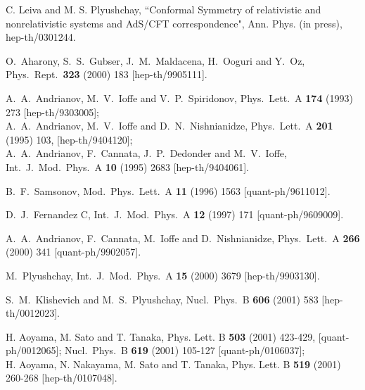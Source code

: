 \documentclass[a4paper,12pt]{article}
\begin{document}
\begin{thebibliography}{99}
C. Leiva and M. S. Plyushchay,
``Conformal Symmetry of relativistic and nonrelativistic
systems and AdS/CFT correspondence",
Ann. Phys. (in press),
hep-th/0301244.


O.~Aharony, S.~S.~Gubser, J.~M.~Maldacena, H.~Ooguri and
Y.~Oz,
Phys.\ Rept.\  {\bf 323} (2000) 183
[hep-th/9905111].


A.~A.~Andrianov, M.~V.~Ioffe and V.~P.~Spiridonov,
Phys.\ Lett.\ A {\bf 174} (1993) 273
[hep-th/9303005];\\
A.~A.~Andrianov, M.~V.~Ioffe and D.~N.~Nishnianidze,
Phys.\ Lett.\ A {\bf 201} (1995) 103,
[hep-th/9404120];\\
A.~A.~Andrianov, F.~Cannata, J.~P.~Dedonder and M.~V.~Ioffe,
Int.\ J.\ Mod.\ Phys.\ A {\bf 10} (1995) 2683
[hep-th/9404061].


B.~F.~Samsonov,
Mod.\ Phys.\ Lett.\ A {\bf 11} (1996) 1563
[quant-ph/9611012].


D.~J.~Fernandez C,
Int.\ J.\ Mod.\ Phys.\ A {\bf 12} (1997) 171
[quant-ph/9609009].

A.~A.~Andrianov, F.~Cannata, M.~Ioffe and D.~Nishnianidze,
Phys.\ Lett.\ A {\bf 266} (2000) 341
[quant-ph/9902057].

M.~Plyushchay,
Int.\ J.\ Mod.\ Phys.\ A {\bf 15} (2000) 3679
[hep-th/9903130].


S.~M.~Klishevich and M.~S.~Plyushchay,
Nucl.\ Phys.\ B {\bf 606} (2001) 583
[hep-th/0012023].


H. Aoyama, M. Sato and T. Tanaka,
Phys. Lett. B {\bf 503} (2001) 423-429,
[quant-ph/0012065];
Nucl.\ Phys.\ B {\bf 619} (2001) 105-127
[quant-ph/0106037];\\
H. Aoyama, N. Nakayama, M. Sato and T. Tanaka,
Phys. Lett. B {\bf 519} (2001) 260-268
[hep-th/0107048].



\end{thebibliography}
\end{document}
